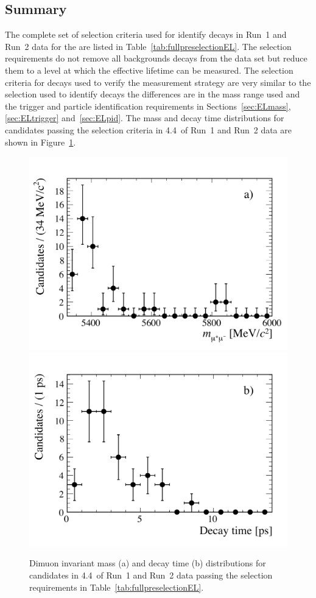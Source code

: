 \subsection{Summary}
\label{sec:ELsummary}
The complete set of selection criteria used for identify \bsmumu decays in Run~1 and Run~2 data for the \elm are listed in Table~\ref{tab:fullpreselectionEL}. %
The selection requirements do not remove all backgrounds decays from the data set but reduce them to a level at which the effective lifetime can be measured. The selection criteria for \bhh decays used to verify the measurement strategy are very similar to the selection used to identify \bmumu decays the differences are in the mass range used and the trigger and particle identification requirements in Sections~\ref{sec:ELmass}, \ref{sec:ELtrigger} and~\ref{sec:ELpid}. The mass and decay time distributions for \bsmumu candidates passing the selection criteria in 4.4~\fb of Run~1 and Run~2 data are shown in Figure~\ref{fig:mass_DT}. 



\begin{figure}[h]
    \centering
        \includegraphics[width=0.65 \textwidth]{./Figs/Selection/mass_candidates.pdf}
        \includegraphics[width=0.65 \textwidth]{./Figs/Selection/lifetime_candidates.pdf}
    \caption{Dimuon invariant mass (a) and decay time (b) distributions for \bsmumu candidates in 4.4~\fb of Run~1 and Run~2 data passing the selection requirements in Table~\ref{tab:fullpreselectionEL}. }
    \label{fig:mass_DT}
\end{figure}




